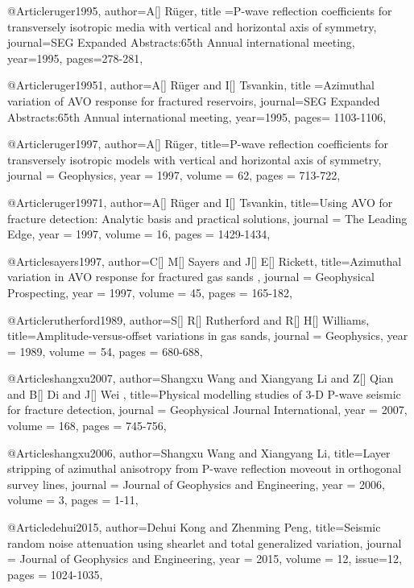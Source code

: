 @Article{ruger1995,
  author={A[] R\"{u}ger},
  title ={P-wave reflection coefficients for transversely isotropic media with vertical and horizontal axis of symmetry},
  journal={SEG Expanded Abstracts:65th Annual international meeting},
  year=1995,
  pages={278-281},
}


@Article{ruger19951,
  author={A[] R\"{u}ger and I[] Tsvankin},
  title ={Azimuthal variation of AVO response for fractured reservoirs},
  journal={SEG Expanded Abstracts:65th Annual international meeting},
  year=1995,
  pages={ 1103-1106},
}

@Article{ruger1997,
  author={A[] R\"{u}ger},
  title={P-wave reflection coefficients for transversely isotropic models with vertical and horizontal axis of symmetry},
  journal = 	 {Geophysics},
  year = 	 1997,
  volume =	 62,
  pages =	 {713-722},
}

@Article{ruger19971,
  author={A[] R\"{u}ger and I[] Tsvankin},
  title={Using AVO for fracture detection: Analytic basis and practical solutions},
  journal = 	 {The Leading Edge},
  year = 	 1997,
  volume =	16,
  pages =	 {1429-1434},
}


@Article{sayers1997,
  author={C[] M[] Sayers and J[] E[] Rickett},
  title={Azimuthal variation in AVO response for fractured gas sands
},
  journal = 	 {Geophysical Prospecting},
  year = 	 1997,
  volume =	45,
  pages =	 {165-182},
}

@Article{rutherford1989,
  author={S[] R[] Rutherford and R[] H[] Williams},
  title={Amplitude-versus-offset variations in gas sands},
  journal = 	 {Geophysics},
  year = 	 1989,
  volume =	54,
  pages =	 {680-688},
}

@Article{shangxu2007,
  author={Shangxu Wang and Xiangyang Li and Z[] Qian and B[] Di and J[] Wei },
  title={Physical modelling studies of 3-D P-wave seismic for fracture detection},
  journal = 	 {Geophysical Journal International},
  year = 	 2007,
  volume =	 168,
  pages =	 {745-756},
}

@Article{shangxu2006,
  author={Shangxu Wang and Xiangyang Li},
  title={Layer stripping of azimuthal anisotropy from P-wave reflection moveout in orthogonal survey lines},
  journal = 	 {Journal of Geophysics and Engineering},
  year = 	 2006,
  volume =	 3,
  pages =	 {1-11},
}

@Article{dehui2015,
  author={Dehui Kong and Zhenming Peng},
  title={Seismic random noise attenuation using shearlet and total generalized variation},
  journal = 	 {Journal of Geophysics and Engineering},
  year = 	 2015,
  volume =	 12,
  issue=12,
  pages =	 {1024-1035},
}

